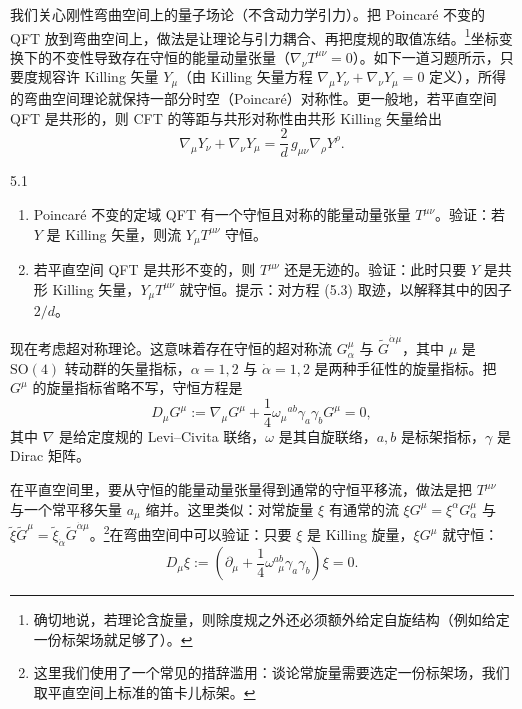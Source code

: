  我们关心刚性弯曲空间上的量子场论（不含动力学引力）。把 Poincaré 不变的 QFT 放到弯曲空间上，做法是让理论与引力耦合、再把度规的取值冻结。\footnote{确切地说，若理论含旋量，则除度规之外还必须额外给定自旋结构（例如给定一份标架场就足够了）。}坐标变换下的不变性导致存在守恒的能量动量张量（$\nabla_\nu T^{\mu\nu}=0$）。如下一道习题所示，只要度规容许 Killing 矢量 $Y_\mu$（由 Killing 矢量方程 $\nabla_\mu Y_\nu+\nabla_\nu Y_\mu=0$ 定义），所得的弯曲空间理论就保持一部分时空（Poincaré）对称性。更一般地，若平直空间 QFT 是共形的，则 CFT 的等距与共形对称性由共形 Killing 矢量给出
\begin{equation}
  \nabla_\mu Y_\nu+\nabla_\nu Y_\mu=\frac{2}{d}\,g_{\mu\nu}\nabla_\rho Y^\rho.
  \tag{5.3}
\end{equation}

\begin{exercise}{5.1}
\begin{enumerate}[label=\arabic*.,leftmargin=2em,itemsep=1pt,topsep=1pt]
\item Poincaré 不变的定域 QFT 有一个守恒且对称的能量动量张量 $T^{\mu\nu}$。验证：若 $Y$ 是 Killing 矢量，则流 $Y_\mu T^{\mu\nu}$ 守恒。
\item 若平直空间 QFT 是共形不变的，则 $T^{\mu\nu}$ 还是无迹的。验证：此时只要 $Y$ 是共形 Killing 矢量，$Y_\mu T^{\mu\nu}$ 就守恒。提示：对方程 (5.3) 取迹，以解释其中的因子 $2/d$。
\end{enumerate}
\end{exercise}


 现在考虑超对称理论。这意味着存在守恒的超对称流 $G_\alpha^\mu$ 与 $\tilde{G}^{\dot\alpha\mu}$，其中 $\mu$ 是 $\mathrm{SO}(4)$ 转动群的矢量指标，$\alpha=1,2$ 与 $\dot\alpha=1,2$ 是两种手征性的旋量指标。把 $G^\mu$ 的旋量指标省略不写，守恒方程是
\begin{equation}
  D_\mu G^\mu:=\nabla_\mu G^\mu+\frac{1}{4}\omega_\mu{}^{ab}\gamma_a\gamma_b G^\mu=0,
  \tag{5.4}
\end{equation}
其中 $\nabla$ 是给定度规的 Levi--Civita 联络，$\omega$ 是其自旋联络，$a,b$ 是标架指标，$\gamma$ 是 Dirac 矩阵。

在平直空间里，要从守恒的能量动量张量得到通常的守恒平移流，做法是把 $T^{\mu\nu}$ 与一个常平移矢量 $a_\mu$ 缩并。这里类似：对常旋量 $\xi$ 有通常的流 $\xi G^\mu=\xi^\alpha G_\alpha^\mu$ 与 $\tilde{\xi}\tilde{G}^\mu=\tilde{\xi}_{\dot\alpha}\tilde{G}^{\dot\alpha\mu}$。\footnote{这里我们使用了一个常见的措辞滥用：谈论常旋量需要选定一份标架场，我们取平直空间上标准的笛卡儿标架。}在弯曲空间中可以验证：只要 $\xi$ 是 Killing 旋量，$\xi G^\mu$ 就守恒：
\begin{equation}
  D_\mu\xi:=\left(\partial_\mu+\frac{1}{4}\omega^{ab}_{\ \ \mu}\gamma_a\gamma_b\right)\xi=0.
  \tag{5.5}
\end{equation}

